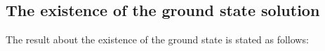 \documentclass[12pt]{amsart}
\begin{document}
%




\subsection{The existence of the ground state solution}

The result about the existence of the ground state is stated as follows: 
\end{document}
